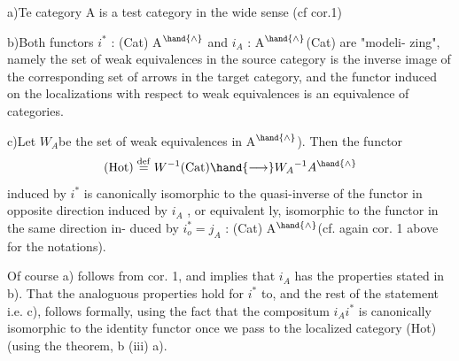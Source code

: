 
a)\quad Te category A is a test category in the wide sense (cf cor.1)

b)\quad Both functors $i^*$ : (Cat)\hand{\ensuremath{\longrightarrow}} A$^{\hand{\wedge}}$ and $i_A$ : A$^{\hand{\wedge}}$\hand{\ensuremath{\longrightarrow}}(Cat) are "modeli-%
zing", namely the set of weak equivalences in the source category
is the inverse image of the corresponding set of arrows in the
target category, and the functor induced on the localizations
with respect to weak equivalences is an equivalence of categories.

c)\quad Let \hand{(}$W_A$\hand{)}be the set of weak equivalences  in A$^{\hand{\wedge}}$). Then the functor
\[ (\mathrm{Hot}) \overset{\mathrm{def}}{=} W^{-1}(\mathrm{Cat}) \hand{\ensuremath{\longrightarrow}} W_A{}^{-1}A^{\hand{\wedge}} \]
induced by $i^*$ is canonically isomorphic to the quasi-inverse
of the functor in opposite direction induced by $i_A$ , or equivalent%
ly,  isomorphic to the functor in the same direction in-%
duced by $i_o^* = j_A$ : (Cat)\hand{\ensuremath{\longrightarrow}} A$^{\hand{\wedge}}$(cf. again cor. 1 above for 
the notations).

Of course a) follows from cor. 1, and implies that $i_A$ has the
properties stated in b). That the analoguous properties hold for $i^*$ to,
and the rest of the statement i.e. c), follows formally, using the fact
that the compositum $i_Ai^*$ is canonically isomorphic to the identity functor
once we pass to the localized category (Hot) (using the theorem,
b (iii) \hand{\ensuremath{\Rightarrow}} a)\hand{)}.

